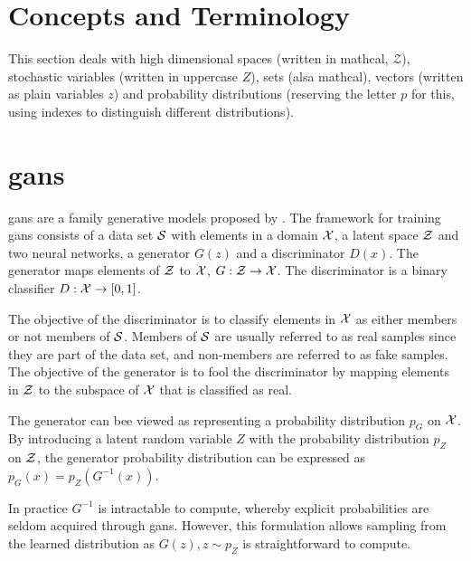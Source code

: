 \section{Concepts and Terminology}
This section deals with high dimensional spaces (written in mathcal, $\mathcal{Z}$), stochastic variables (written in uppercase $Z$), sets (alsa mathcal), vectors (written as plain variables $z$) and probability distributions (reserving the letter $p$ for this, using indexes to distinguish different distributions).


\section{\acrlong{gans}}
\acrfull{gans} are a family generative models proposed by \textcite{goodfellow2014generative}. The framework for training \acrshort{gans} consists of a data set $\mathcal{S}$ with elements in a domain $\mathcal{X}$, a latent space $\mathcal{Z}$ and two neural networks, a generator $G(z)$ and a discriminator $D(x)$. The generator maps elements of $\mathcal{Z}$ to $\mathcal{X}$, $G: \mathcal{Z} \rightarrow \mathcal{X}$. The discriminator is a binary classifier $D: \mathcal{X} \rightarrow [0, 1]$. 

The objective of the discriminator is to classify elements in $\mathcal{X}$ as either members or not members of $\mathcal{S}$. Members of $\mathcal{S}$ are usually referred to as real samples since they are part of the data set, and non-members are referred to as fake samples. The objective of the generator is to fool the discriminator by mapping elements in $\mathcal{Z}$ to the subspace of $\mathcal{X}$ that is classified as real. 

The generator can bee viewed as representing a probability distribution $p_G$ on $\mathcal{X}$. By introducing a latent random variable $Z$ with the probability distribution $p_Z$ on $\mathcal{Z}$, the generator probability distribution can be expressed as $p_G(x) = p_Z(G^{-1}(x))$. 

In practice $G^{-1}$ is intractable to compute, whereby explicit probabilities are seldom acquired through \acrshort{gans}. However, this formulation allows sampling from the learned distribution as $G(z), z \sim p_Z$ is straightforward to compute. 

